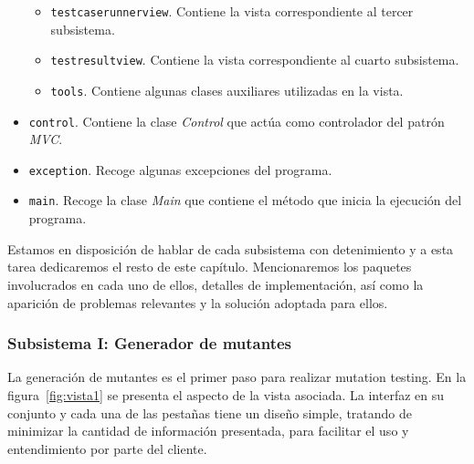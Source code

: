 \begin{itemize}
\begin{itemize}
	\item \texttt{testcaserunnerview}. Contiene la vista correspondiente al tercer subsistema.
	\item \texttt{testresultview}. Contiene la vista correspondiente al cuarto subsistema.
	\item \texttt{tools}. Contiene algunas clases auxiliares utilizadas en la vista.
	\end{itemize}
\item \texttt{control}. Contiene la clase \textit{Control} que actúa como controlador del patrón \textit{MVC}.
\item \texttt{exception}. Recoge algunas excepciones del programa.
\item \texttt{main}. Recoge la clase \textit{Main} que contiene el método que inicia la ejecución del programa.
\end{itemize}

Estamos en disposición de hablar de cada subsistema con detenimiento y a esta tarea dedicaremos el resto de este capítulo. Mencionaremos los paquetes involucrados en cada uno de ellos, detalles de implementación, así como la aparición de problemas relevantes y la solución adoptada para ellos.

\subsubsection{Subsistema I: Generador de mutantes}

La generación de mutantes es el primer paso para realizar mutation testing. En la figura~\ref{fig:vista1} se presenta el aspecto de la vista asociada. La interfaz en su conjunto y cada una de las pestañas tiene un diseño simple, tratando de minimizar la cantidad de información presentada, para facilitar el uso y entendimiento por parte del cliente.

